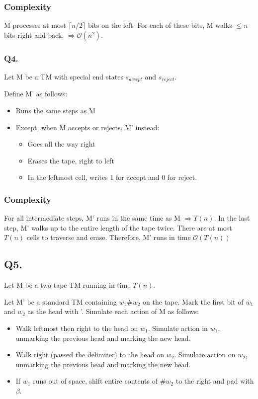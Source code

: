 \documentclass[letterpaper]{article}
\begin{document}
\subsubsection*{Complexity}

M processes at most $\lceil n/2 \rceil$ bits on the left. For each of these
bits, M walks $\le n$ bits right and back. $\Rightarrow \mathcal{O}(n^2)$.

\subsubsection*{Q4.}

Let M be a TM with special end states $s_{accept}$ and $s_{reject}$.

Define M' as follows:
\begin{itemize}
      \item Runs the same steps as M
      \item Except, when M accepts or rejects, M' instead:
            \begin{itemize}
                  \item Goes all the way right
                  \item Erases the tape, right to left
                  \item In the leftmost cell, writes 1 for accept and 0 for reject.
            \end{itemize}
\end{itemize}

\subsubsection*{Complexity}

For all intermediate steps, M' runs in the same time as M $\Rightarrow T(n)$.
In the last step, M' walks up to the entire length of the tape twice.
There are at most $T(n)$ cells to traverse and erase. Therefore, M' runs in
time $\mathcal{O}(T(n))$

\subsection*{Q5.}

Let M be a two-tape TM running in time $T(n)$.

Let M' be a standard TM containing $w_1 \# w_2$ on the tape.
Mark the first bit of $w_1$ and $w_2$ as the head with '.
Simulate each action of M as follows:
\begin{itemize}
      \item Walk leftmost then right to the head on $w_1$.
            Simulate action in $w_1$, unmarking the previous head and marking
            the new head.
      \item Walk right (passed the delimiter) to the head on $w_2$.
            Simulate action on $w_2$, unmarking the previous head and marking
            the new head.
      \item If $w_1$ runs out of space, shift entire contents of $\# w_2$
            to the right and pad with $\beta$.
\end{itemize}
\end{document}
